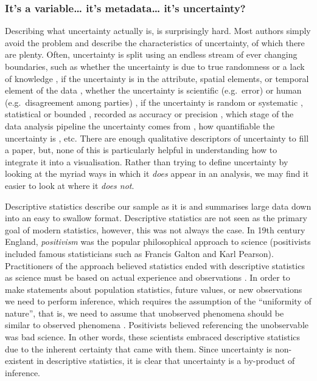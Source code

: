 \documentclass[
  12pt]{article}
\begin{document}
\subsubsection{It's a variable\ldots{} it's metadata\ldots{} it's
uncertainty?}\label{its-a-variable-its-metadata-its-uncertainty}

Describing what uncertainty actually is, is surprisingly hard. Most
authors simply avoid the problem and describe the characteristics of
uncertainty, of which there are plenty. Often, uncertainty is split
using an endless stream of ever changing boundaries, such as whether the
uncertainty is due to true randomness or a lack of knowledge
\citep{Spiegelhalter2017, Hullman2016, utypo}, if the uncertainty is in
the attribute, spatial elements, or temporal element of the data
\citep{Kinkeldey2014}, whether the uncertainty is scientific
(e.g.~error) or human (e.g.~disagreement among parties)
\citep{Benjamin2018}, if the uncertainty is random or systematic
\citep{Sanyal2009}, statistical or bounded
\citep{Gschwandtnei2016, Olston2002}, recorded as accuracy or precision
\citep{Griethe2006, Benjamin2018}, which stage of the data analysis
pipeline the uncertainty comes from \citep{utypo}, how quantifiable the
uncertainty is \citep{Spiegelhalter2017, utypo}, etc. There are enough
qualitative descriptors of uncertainty to fill a paper, but, none of
this is particularly helpful in understanding how to integrate it into a
visualisation. Rather than trying to define uncertainty by looking at
the myriad ways in which it \emph{does} appear in an analysis, we may
find it easier to look at where it \emph{does not}.

Descriptive statistics describe our sample as it is and summarises large
data down into an easy to swallow format. Descriptive statistics are not
seen as the primary goal of modern statistics, however, this was not
always the case. In 19th century England, \emph{positivism} was the
popular philosophical approach to science (positivists included famous
statisticians such as Francis Galton and Karl Pearson). Practitioners of
the approach believed statistics ended with descriptive statistics as
science must be based on actual experience and observations
\citep{Otsuka2023}. In order to make statements about population
statistics, future values, or new observations we need to perform
inference, which requires the assumption of the ``uniformity of
nature'', that is, we need to assume that unobserved phenomena should be
similar to observed phenomena \citep{Otsuka2023}. Positivists believed
referencing the unobservable was bad science. In other words, these
scientists embraced descriptive statistics due to the inherent certainty
that came with them. Since uncertainty is non-existent in descriptive
statistics, it is clear that uncertainty is a by-product of inference.
\end{document}
